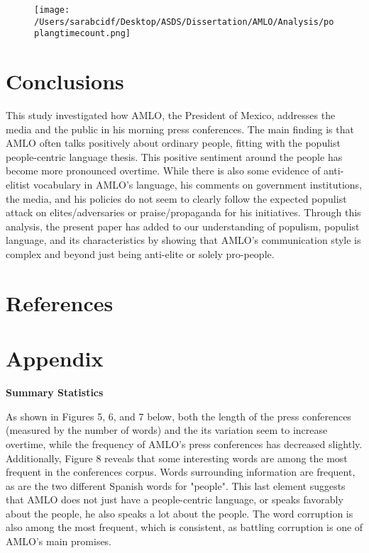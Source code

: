 \documentclass[]{article}
\begin{document}
\begin{figure}[H]
	\centering
	\caption{\label{}}
	\texttt{[image: /Users/sarabcidf/Desktop/ASDS/Dissertation/AMLO/Analysis/poplangtimecount.png]}
\end{figure}

\section{Conclusions}

This study investigated how AMLO, the President of Mexico, addresses the media and the public in his morning press conferences. The main finding is that AMLO often talks positively about ordinary people, fitting with the populist people-centric language thesis. This positive sentiment around the people has become more pronounced overtime. While there is also some evidence of anti-elitist vocabulary in AMLO's language, his comments on government institutions, the media, and his policies do not seem to clearly follow the expected populist attack on elites/adversaries or praise/propaganda for his initiatives. Through this analysis, the present paper has added to our understanding of populism, populist language, and its characteristics by showing that AMLO's communication style is complex and beyond just being anti-elite or solely pro-people. 

\section{References}




\vspace{.5cm}
\section{Appendix}

\vspace{.5cm}
\noindent\textbf{Summary Statistics}
\vspace{.5cm}

As shown in Figures 5, 6, and 7 below, both the length of the press conferences (measured by the number of words) and the its variation seem to increase overtime, while the frequency of AMLO's press conferences has decreased slightly. Additionally, Figure 8 reveals that some interesting words are among the most frequent in the conferences corpus. Words surrounding information are frequent, as are the two different Spanish words for "people". This last element suggests that AMLO does not just have a people-centric language, or speaks favorably about the people, he also speaks a lot about the people. The word corruption is also among the most frequent, which is consistent, as battling corruption is one of AMLO's main promises.  
\end{document}
